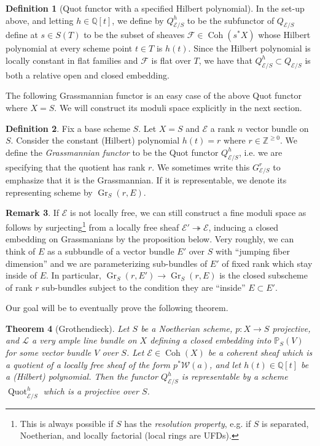 \documentclass[10pt]{article}
\newtheorem{thm}{Theorem}[section]
\theoremstyle{definition}
\newtheorem{defn}[thm]{Definition}
\newtheorem{rmk}[thm]{Remark}
\DeclareMathOperator{\Coh}{Coh}
\DeclareMathOperator{\Quot}{Quot}
\newcommand{\Z}{\mathbb{Z}}
\DeclareMathOperator{\Gr}{Gr}
\newcommand{\Q}{\mathbb{Q}}
\begin{document}
\begin{defn}[Quot functor with a specified Hilbert polynomial]
In the set-up above, and letting $h \in \Q[t]$, we define by $Q^h_{\mathcal{E}/S}$ to be the subfunctor of $Q_{\mathcal{E}/S}$ define at $s \in S(T)$ to be the subset of sheaves $\mathcal{F} \in \Coh(s^*X)$ whose Hilbert polynomial at every scheme point $t \in T$ is $h(t)$.  Since the Hilbert polynomial is locally constant in flat families and $\mathcal{F}$ is flat over $T$, we have that $Q^h_{\mathcal{E}/S} \subset Q_{\mathcal{E}/S}$ is both a relative open and closed embedding.
\end{defn}

The following Grassmannian functor is an easy case of the above Quot functor where $X = S$.  We will construct its moduli space explicitly in the next section.
\begin{defn}
Fix a base scheme $S$.  Let $X = S$ and $\mathcal{E}$ a rank $n$ vector bundle on $S$.  Consider the constant (Hilbert) polynomial $h(t) = r$ where $r \in \Z^{\geq 0}$.  We define the \emph{Grassmannian functor} to be the Quot functor $Q_{\mathcal{E}/S}^h$, i.e. we are specifying that the quotient has rank $r$.  We sometimes write this $G_{\mathcal{E}/S}^r$ to emphasize that it is the Grassmannian.  If it is representable, we denote its representing scheme by $\Gr_S(r, E)$.
\end{defn}

\begin{rmk}
If $\mathcal{E}$ is not locally free, we can still construct a fine moduli space as follows by surjecting\footnote{This is always possible if $S$ has the \emph{resolution property}, e.g. if $S$ is separated, Noetherian, and locally factorial (local rings are UFDs).} from a locally free sheaf $\mathcal{E}' \twoheadrightarrow \mathcal{E}$, inducing a closed embedding on Grassmanians by the proposition below.  Very roughly, we can think of $E$ as a subbundle of a vector bundle $E'$ over $S$ with ``jumping fiber dimension'' and we are parameterizing sub-bundles of $E'$ of fixed rank which stay inside of $E$.  In particular, $\Gr_S(r, E') \rightarrow \Gr_S(r, E)$ is the closed subscheme of rank $r$ sub-bundles subject to the condition they are ``inside'' $E \subset E'$.
\end{rmk}



Our goal will be to eventually prove the following theorem.
\begin{thm}[Grothendieck]
Let $S$ be a Noetherian scheme, $p: X \rightarrow S$ projective, and $\mathcal{L}$ a very ample line bundle on $X$ defining a closed embedding into $\mathbb{P}_S(V)$ for some vector bundle $V$ over $S$.  %
Let $\mathcal{E} \in \Coh(X)$ be a coherent sheaf which is a quotient of a locally free sheaf of the form $p^*\mathcal{W}(a)$, and let $h(t) \in \Q[t]$ be a (Hilbert) polynomial.  Then the functor $Q_{\mathcal{E}/S}^h$ is representable by a scheme $\Quot_{\mathcal{E}/S}^h$ which is a projective over $S$.
\end{thm}
\end{document}

